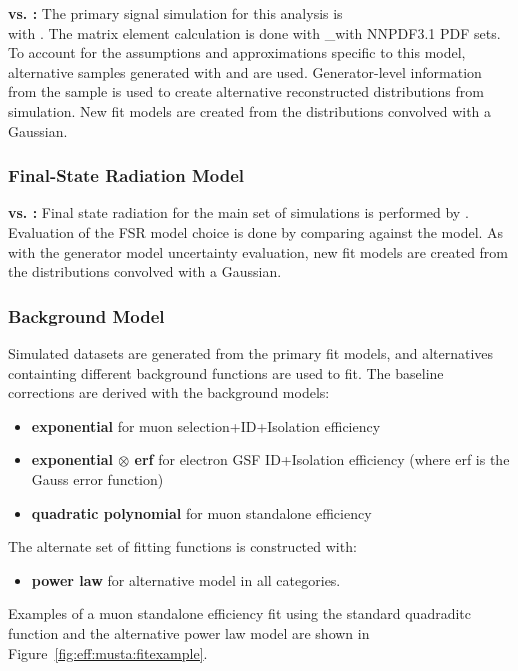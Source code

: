 \textbf{\aMCATNLO vs. \POWHEG:} The primary signal simulation for this analysis is \\\aMCATNLO with . The matrix element calculation is done with \_\aMCATNLO with NNPDF3.1 PDF sets. To account for the assumptions and approximations specific to this model, alternative samples generated with \POWHEG and  are used. Generator-level information from the \POWHEG sample is used to create alternative reconstructed \mll distributions from simulation. New fit models are created from the \POWHEG \mll distributions convolved with a Gaussian.
\subsubsection{Final-State Radiation Model}
\textbf{\PYTHIA vs. \PHOTOS:} Final state radiation for the main set of simulations is performed by . Evaluation of the FSR model choice is done by comparing \PYTHIA against the \PHOTOS model. As with the generator model uncertainty evaluation, new fit models are created from the \PHOTOS \mll distributions convolved with a Gaussian.
\subsubsection{Background Model}\label{ch:eff:bkg}
Simulated datasets are generated from the primary fit models, and alternatives containting different background functions are used to fit. The baseline corrections are derived with the background models: 
\begin{itemize}
\item \textbf{exponential} for muon selection+ID+Isolation efficiency
\item \textbf{exponential $\otimes$ erf} for electron GSF ID+Isolation efficiency (where erf is the Gauss error function)
\item \textbf{quadratic polynomial} for muon standalone efficiency
\end{itemize}
The alternate set of fitting functions is constructed with:
\begin{itemize}
\item \textbf{power law} for alternative model in all categories.
\end{itemize}
Examples of a muon standalone efficiency fit using the standard quadraditc function and the alternative power law model are shown in Figure~\ref{fig:eff:musta:fitexample}. 

